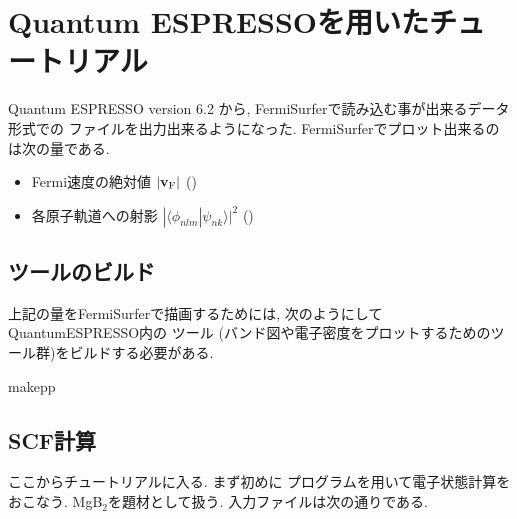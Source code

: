 \documentclass[letterpaper,10pt,dvipdfmx,openany]{sphinxmanual}
\begin{document}
\chapter{Quantum ESPRESSOを用いたチュートリアル}
\label{\detokenize{qe:quantum-espresso}}\label{\detokenize{qe::doc}}
\sphinxAtStartPar
Quantum ESPRESSO version 6.2 から, FermiSurferで読み込む事が出来るデータ形式での
ファイルを出力出来るようになった.
FermiSurferでプロット出来るのは次の量である.
\begin{itemize}
\item {} 
\sphinxAtStartPar
Fermi速度の絶対値 \(|{\bf v}_{\rm F}|\) ()

\item {} 
\sphinxAtStartPar
各原子軌道への射影 \(|\langle \phi_{n l m} | \psi_{n k} \rangle|^2\) ()

\end{itemize}


\section{ ツールのビルド}
\label{\detokenize{qe:postprocess}}
\sphinxAtStartPar
上記の量をFermiSurferで描画するためには, 次のようにしてQuantumESPRESSO内の  ツール
(バンド図や電子密度をプロットするためのツール群)をビルドする必要がある.

\begin{sphinxVerbatim}[commandchars=\\\{\}]
\PYGZdl{}makepp
\end{sphinxVerbatim}


\section{SCF計算}
\label{\detokenize{qe:scf}}
\sphinxAtStartPar
ここからチュートリアルに入る.
まず初めに  プログラムを用いて電子状態計算をおこなう.
MgB$_{\text{2}}$を題材として扱う.
入力ファイルは次の通りである.

\sphinxAtStartPar
{}
\end{document}
